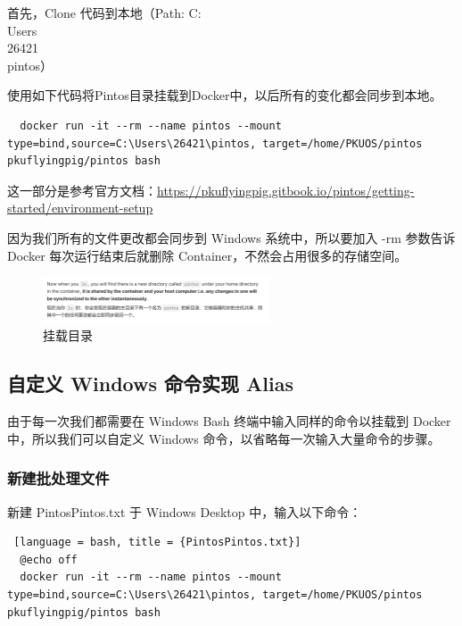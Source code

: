 首先，Clone 代码到本地（Path: C:\\Users\\26421\\pintos）

使用如下代码将Pintos目录挂载到Docker中，以后所有的变化都会同步到本地。

\begin{lstlisting}
  docker run -it --rm --name pintos --mount type=bind,source=C:\Users\26421\pintos, target=/home/PKUOS/pintos pkuflyingpig/pintos bash
\end{lstlisting}

这一部分是参考官方文档：\href{https://pkuflyingpig.gitbook.io/pintos/getting-started/environment-setup}{\underline{https://pkuflyingpig.gitbook.io/pintos/getting-started/environment-setup}}

因为我们所有的文件更改都会同步到 Windows 系统中，所以要加入 -rm 参数告诉 Docker 每次运行结束后就删除 Container，不然会占用很多的存储空间。

\begin{figure} [H]
  \centering
  \includegraphics[width=0.6\textwidth]{img1/Shared.png}
  \caption{挂载目录}
  \label{fig:mount}
\end{figure}

\subsection{自定义 Windows 命令实现 Alias}

由于每一次我们都需要在 Windows Bash 终端中输入同样的命令以挂载到 Docker 中，所以我们可以自定义 Windows 命令，以省略每一次输入大量命令的步骤。

\subsubsection*{新建批处理文件}

新建 PintosPintos.txt 于 Windows Desktop 中，输入以下命令：

\begin{lstlisting} [language = bash, title = {PintosPintos.txt}]
  @echo off
  docker run -it --rm --name pintos --mount type=bind,source=C:\Users\26421\pintos, target=/home/PKUOS/pintos pkuflyingpig/pintos bash
\end{lstlisting}

